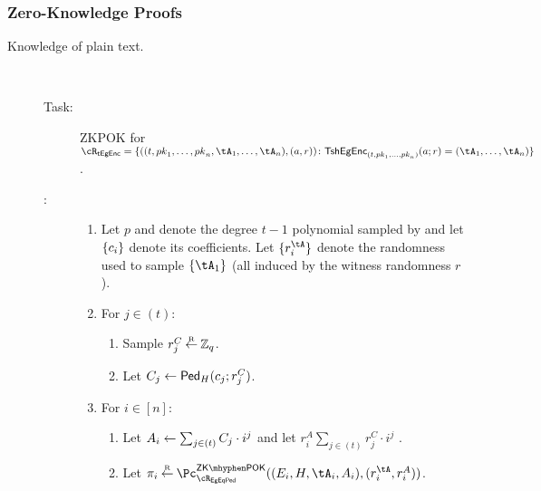 \newcommand{\TsEgEncs}{{{\sf tEgEnc}}}
\newcommand{\rTsEgEnc}{\cR_\TsEgEncs}
\newcommand{\rTsEgEncDef}
{
	\sset{((t,\pk_1,\ldots,\pk_n,\tA_1,\ldots,\tA_n),(a,r))\colon \tsEgEnc_{(t,\pk_1,\ldots,\pk_n)}(a;r)= (\tA_1,\ldots,\tA_n)}
}



\subsubsection{Zero-Knowledge Proofs}\label{sec:ChanksEg:tsEGinExp:ZK}


\begin{description}




\item[Knowledge of plain text.] ~

\begin{description}
	\item[Task:] ZKPOK for  $\rTsEgEnc=\rTsEgEncDef$.
	
	\item[\Pc:]   

	\begin{enumerate}
	\item Let $p$  and denote the degree $t-1$ polynomial  sampled by \tsEgEnc and let $\{c_i\}$ denote its coefficients.   Let $\sset{r_i^{\tA}}$ denote the  randomness used to sample $\set{\tA_1}$  (all induced by the  witness randomness $r$).
	
	
	\item For $j\in (t)$: 
	
	\begin{enumerate}
		\item Sample  $r^C_j\mathbin{\stackrel{\mbox{\tiny R}}{\leftarrow}} {\mathbb Z}_q$.
		
		\item Let $C_j \leftarrow \mathsf{Ped}_{H}(c_j;r^C_j)$.
		
	\end{enumerate}
	
	\item  For $i \in [n]$: 
	
	
	\begin{enumerate}
		\item  Let $A_i \leftarrow  \sum_{j\in (t)} C_j  \cdot i^j$ and let $r_i^A  \sum_{j\in (t)} r^C_j  \cdot i^j$ . 
		
	
		\item Let $\pi_i \getsr \pZKPOK{\rEgEqPed}((E_i,H,\tA_i,A_i),(r_i^{\tA},r_i^A))$.
	\end{enumerate}
	

\end{enumerate}
\end{description}
\end{description}
